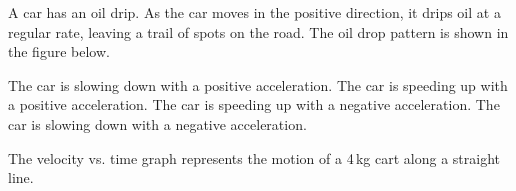\documentclass[answers]{exam}
\begin{document}
\begin{questions}

\question
A car has an oil drip. As the car moves in the positive direction, it drips oil at a regular rate, leaving a trail of spots on the road. The oil drop pattern is shown in the figure below.

\begin{center}
\end{center}

\begin{randomizechoices}
    \choice The car is slowing down with a positive acceleration.
    \choice The car is speeding up with a positive acceleration.
    \choice The car is speeding up with a negative acceleration.
    \correctchoice The car is slowing down with a negative acceleration.
\end{randomizechoices}

\question
The velocity vs. time graph represents the motion of a 4\,kg cart along a straight line.

\begin{center}
\end{center}


\end{questions}
\end{document}

